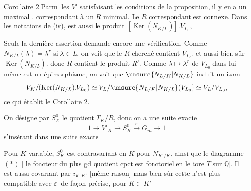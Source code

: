 \uline{Corollaire 2} Parmi les $V'$ satisfaisant les conditions de la proposition,
il y en a un maximal 
, correspondant à un $R$ minimal.
Le $R$ correspondant est connexe. Dans les notations de (iv),
est aussi le produit $[\operatorname{Ker}(N_{K/L})].V_{L_0}$,

Seule la dernière assertion demande encore une vérification.
Comme $N_{K/L}(\lambda)=\lambda^r$ si $\lambda\in L$, on voit que le $R$ cherché
contient $V_{L_0}$, et aussi bien sûr $\operatorname{Ker}(N_{K/L})$.
 donc $R$ contient le produit $R'$.
 Comme $\lambda\mapsto\lambda^r$ de $V_{L_0}$ dans lui-même est un épimorphisme,
on voit que $\unsure{N_{L/K}|N_{K/L}}$ induit un isom.
\[
V_K/(\operatorname{Ker}(N_{K/L}).V_{L_0})\simeq
V_L/\unsure{N_{L/K}|N_{K/L}}(V_{L_0})\simeq V_L/V_{L_0},
\]
ce qui établit le Corollaire 2.

On désigne par $S_K^0$ le quotient $T_K/R$, donc on a une suite exacte
\[
1\longrightarrow V'_K\longrightarrow S_K^0\xrightarrow{\varepsilon}G_m\longrightarrow1
\]
s'insérant dans une suite exacte

Pour $K$ variable, $S_K^0$ est contravariant en $K$ pour $N_{K'/K}$,
ainsi que le diagramme $(*)$ [ le foncteur du plus gd
quotient cpct est fonctoriel en le tore $T$ sur $\mathbb Q$].
Il est aussi covariant \deleted{\unsure{-}} par $i_{K,K'}$ [même raison]
mais bien sûr cette  n'est plus compatible avec $\varepsilon$,
 de façon précise, pour $K\subset K'$
